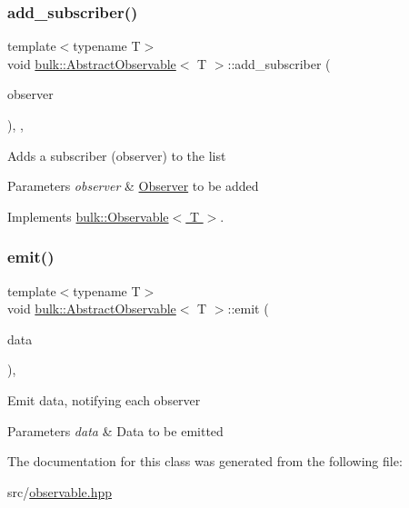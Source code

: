 \subsubsection{\texorpdfstring{add\+\_\+subscriber()}{add\_subscriber()}}
{\footnotesize\ttfamily template$<$typename T$>$ \\
void \hyperlink{classbulk_1_1AbstractObservable}{bulk\+::\+Abstract\+Observable}$<$ T $>$\+::add\+\_\+subscriber (\begin{DoxyParamCaption}\item[{const std\+::shared\+\_\+ptr$<$ \hyperlink{classbulk_1_1Observer}{Observer}$<$ T $>$$>$ \&}]{observer }\end{DoxyParamCaption})\hspace{0.3cm}{\ttfamily [inline]}, {\ttfamily [override]}, {\ttfamily [virtual]}}

Adds a subscriber (observer) to the list 
\begin{DoxyParams}{Parameters}
{\em observer} & \hyperlink{classbulk_1_1Observer}{Observer} to be added \\
\hline
\end{DoxyParams}


Implements \hyperlink{classbulk_1_1Observable_a1d014ef91398bff19bf96d9ef6bd5e10}{bulk\+::\+Observable$<$ T $>$}.

\mbox{\label{classbulk_1_1AbstractObservable_a95ccf77b0c8774129fd1d2b25642356e}} 
\subsubsection{\texorpdfstring{emit()}{emit()}}
{\footnotesize\ttfamily template$<$typename T$>$ \\
void \hyperlink{classbulk_1_1AbstractObservable}{bulk\+::\+Abstract\+Observable}$<$ T $>$\+::emit (\begin{DoxyParamCaption}\item[{const T \&}]{data }\end{DoxyParamCaption})\hspace{0.3cm}{\ttfamily [inline]}, {\ttfamily [protected]}}

Emit data, notifying each observer 
\begin{DoxyParams}{Parameters}
{\em data} & Data to be emitted \\
\hline
\end{DoxyParams}


The documentation for this class was generated from the following file\+:\begin{DoxyCompactItemize}
\item 
src/\hyperlink{observable_8hpp}{observable.\+hpp}\end{DoxyCompactItemize}
